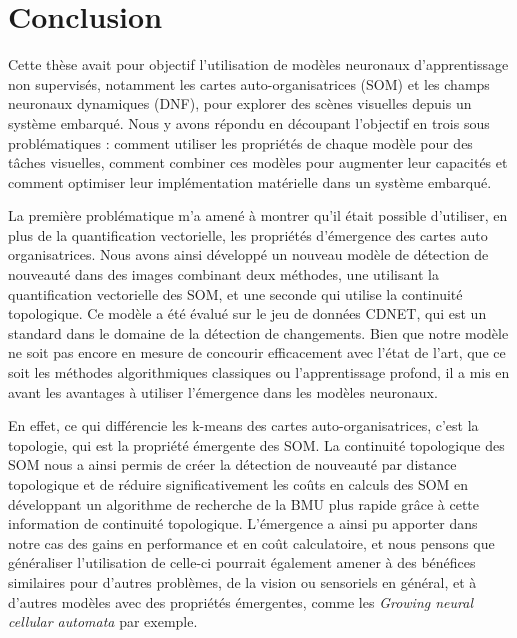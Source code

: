 \chapter*{Conclusion}

Cette thèse avait pour objectif l'utilisation de modèles neuronaux d'apprentissage non supervisés, notamment les cartes auto-organisatrices (SOM) et les champs neuronaux dynamiques (DNF), pour explorer des scènes visuelles depuis un système embarqué. Nous y avons répondu en découpant l'objectif en trois sous problématiques : comment utiliser les propriétés de chaque modèle pour des tâches visuelles, comment combiner ces modèles pour augmenter leur capacités et comment optimiser leur implémentation matérielle dans un système embarqué.

La première problématique m'a amené à montrer qu'il était possible d'utiliser, en plus de la quantification vectorielle, les propriétés d'émergence des cartes auto organisatrices. Nous avons ainsi développé un nouveau modèle de détection de nouveauté dans des images combinant deux méthodes, une utilisant la quantification vectorielle des SOM, et une seconde qui utilise la continuité topologique. Ce modèle a été évalué sur le jeu de données CDNET, qui est un standard dans le domaine de la détection de changements. Bien que notre modèle ne soit pas encore en mesure de concourir efficacement avec l'état de l'art, que ce soit les méthodes algorithmiques classiques ou l'apprentissage profond, il a mis en avant les avantages à utiliser l'émergence dans les modèles neuronaux.

En effet, ce qui différencie les k-means des cartes auto-organisatrices, c'est la topologie, qui est la propriété émergente des SOM. La continuité topologique des SOM nous a ainsi permis de créer la détection de nouveauté par distance topologique et de réduire significativement les coûts en calculs des SOM en développant un algorithme de recherche de la BMU plus rapide grâce à cette information de continuité topologique. L'émergence a ainsi pu apporter dans notre cas des gains en performance et en coût calculatoire, et nous pensons que généraliser l'utilisation de celle-ci pourrait également amener à des bénéfices similaires pour d'autres problèmes, de la vision ou sensoriels en général, et à d'autres modèles avec des propriétés émergentes, comme les \textit{Growing neural cellular automata} \cite{mordvintsev2020growing} par exemple.

